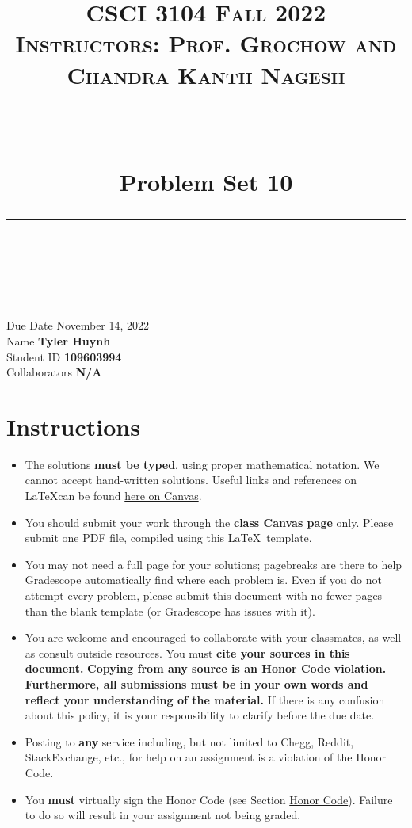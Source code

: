 \documentclass[11pt]{article}
\title{
\normalfont \normalsize 
\textsc{CSCI 3104 Fall 2022 \\ 
Instructors: Prof. Grochow and Chandra Kanth Nagesh} \\
[10pt] 
\rule{\linewidth}{0.5pt} \\[6pt] 
\huge Problem Set 10 \\
\rule{\linewidth}{2pt}  \\[10pt]
}
\date{}
\theoremstyle{definition}
\theoremstyle{definition}
\theoremstyle{definition}
\begin{document}

\maketitle


\noindent
Due Date \dotfill November 14, 2022 \\
Name \dotfill \textbf{Tyler Huynh} \\
Student ID \dotfill \textbf{109603994} \\
Collaborators \dotfill \textbf{N/A}

\tableofcontents

\section*{Instructions}
 \begin{itemize}
	\item The solutions \textbf{must be typed}, using proper mathematical notation. We cannot accept hand-written solutions. Useful links and references on \LaTeX can be found \href{https://canvas.colorado.edu/courses/75824/pages/latex}{here on Canvas}.
	\item You should submit your work through the \textbf{class Canvas page} only. Please submit one PDF file, compiled using this \LaTeX \ template.
	\item You may not need a full page for your solutions; pagebreaks are there to help Gradescope automatically find where each problem is. Even if you do not attempt every problem, please submit this document with no fewer pages than the blank template (or Gradescope has issues with it).

	\item You are welcome and encouraged to collaborate with your classmates, as well as consult outside resources. You must \textbf{cite your sources in this document.} \textbf{Copying from any source is an Honor Code violation. Furthermore, all submissions must be in your own words and reflect your understanding of the material.} If there is any confusion about this policy, it is your responsibility to clarify before the due date. 

	\item Posting to \textbf{any} service including, but not limited to Chegg, Reddit, StackExchange, etc., for help on an assignment is a violation of the Honor Code.

	\item You \textbf{must} virtually sign the Honor Code (see Section \hyperlink{HonorCode}{Honor Code}). Failure to do so will result in your assignment not being graded.
\end{itemize}
\end{document}
